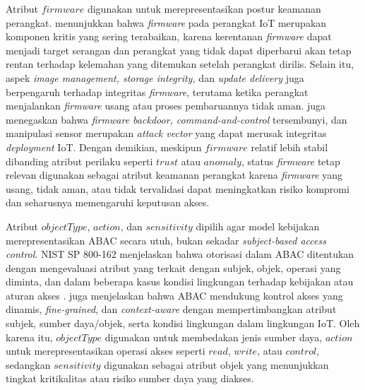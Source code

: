 Atribut $firmware$ digunakan untuk merepresentasikan postur keamanan perangkat. \textcite{bakhshi_review_2024} menunjukkan bahwa \textit{firmware} pada perangkat IoT merupakan komponen kritis yang sering terabaikan, karena kerentanan \textit{firmware} dapat menjadi target serangan dan perangkat yang tidak dapat diperbarui akan tetap rentan terhadap kelemahan yang ditemukan setelah perangkat dirilis. Selain itu, aspek \textit{image management, storage integrity,} dan \textit{update delivery} juga berpengaruh terhadap integritas \textit{firmware}, terutama ketika perangkat menjalankan \textit{firmware} usang atau proses pembaruannya tidak aman. \textcite{altaibek_survey_2025} juga menegaskan bahwa \textit{firmware backdoor, command-and-control} tersembunyi, dan manipulasi sensor merupakan \textit{attack vector} yang dapat merusak integritas \textit{deployment} IoT. Dengan demikian, meskipun $firmware$ relatif lebih stabil dibanding atribut perilaku seperti $trust$ atau $anomaly$, status \textit{firmware} tetap relevan digunakan sebagai atribut keamanan perangkat karena \textit{firmware} yang usang, tidak aman, atau tidak tervalidasi dapat meningkatkan risiko kompromi dan seharusnya memengaruhi keputusan akses.

Atribut $objectType$, $action$, dan $sensitivity$ dipilih agar model kebijakan merepresentasikan ABAC secara utuh, bukan sekadar \textit{subject-based access control}. NIST SP 800-162 menjelaskan bahwa otorisasi dalam ABAC ditentukan dengan mengevaluasi atribut yang terkait dengan subjek, objek, operasi yang diminta, dan dalam beberapa kasus kondisi lingkungan terhadap kebijakan atau aturan akses \parencite{hu_guide_2014}. \textcite{ullah_survey_2023} juga menjelaskan bahwa ABAC mendukung kontrol akses yang dinamis, \textit{fine-grained}, dan \textit{context-aware} dengan mempertimbangkan atribut subjek, sumber daya/objek, serta kondisi lingkungan dalam lingkungan IoT. Oleh karena itu, $objectType$ digunakan untuk membedakan jenis sumber daya, $action$ untuk merepresentasikan operasi akses seperti $read$, $write$, atau $control$, sedangkan $sensitivity$ digunakan sebagai atribut objek yang menunjukkan tingkat kritikalitas atau risiko sumber daya yang diakses.

